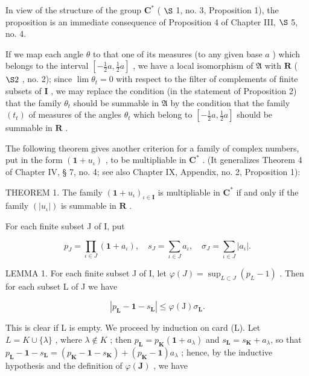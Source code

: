 In view of the structure of the group \(\mathbf{C}^*\) ( \(\S\) 1, no. 3, Proposition 1), the proposition is an immediate consequence of Proposition 4 of Chapter III, \(\S\) 5, no. 4.

If we map each angle \(\theta\) to that one of its measures (to any given base \(a\) ) which belongs to the interval \([- \frac{1}{2} a, \frac{1}{2} a]\) , we have a local isomorphism of \(\mathfrak{A}\) with \(\mathbf{R}\) ( \(\S 2\) , no. 2); since \(\lim \theta_{t} = 0\) with respect to the filter of complements of finite subsets of \(\mathbf{I}\) , we may replace the condition (in the statement of Proposition 2) that the family \(\theta_t\) should be summable in \(\mathfrak{A}\) by the condition that the family \((t_t)\) of measures of the angles \(\theta_t\) which belong to \([- \frac{1}{2} a, \frac{1}{2} a]\) should be summable in \(\mathbf{R}\) .

The following theorem gives another criterion for a family of complex numbers, put in the form \((\mathbf{1} + u_{\iota})\) , to be multipliable in \(\mathbf{C}^*\) . (It generalizes Theorem 4 of Chapter IV, § 7, no. 4; see also Chapter IX, Appendix, no. 2, Proposition 1):

THEOREM 1. The family \((\mathbf{1} + u_{\iota})_{\iota \in \mathbf{I}}\) is multipliable in \(\mathbf{C}^*\) if and only if the family \((|u_{\iota}|)\) is summable in \(\mathbf{R}\) .

For each finite subset J of I, put

\[
p _ {J} = \prod_ {\iota \in J} (\mathbf{1} + a _ {\iota}), \quad s _ {J} = \sum_ {\iota \in J} a _ {\iota}, \quad \sigma_ {J} = \sum_ {\iota \in J} | a _ {\iota} |.
\]

LEMMA 1. For each finite subset J of I, let \(\varphi(J) = \sup_{L \subset J} (p_L - 1)\) . Then for each subset L of J we have

\[
\left| p _ {\mathbf {L}} - \mathbf {1} - s _ {\mathbf {L}} \right| \leqslant \varphi (\mathrm{J}) \sigma_ {\mathbf {L}}.\tag{2}
\]

This is clear if L is empty. We proceed by induction on card (L). Let \(L = K \cup \{\lambda\}\) , where \(\lambda \notin K\) ; then \(p_{\mathbf{L}} = p_{\mathbf{K}}(\mathbf{1} + a_{\lambda})\) and \(s_{\mathbf{L}} = s_{\mathbf{K}} + a_{\lambda}\), so that \(p_{\mathbf{L}} - \mathbf{1} - s_{\mathbf{L}} = (p_{\mathbf{K}} - \mathbf{1} - s_{\mathbf{K}}) + (p_{\mathbf{K}} - \mathbf{1})a_{\lambda}\) ; hence, by the inductive hypothesis and the definition of \(\varphi(\mathbf{J})\) , we have

